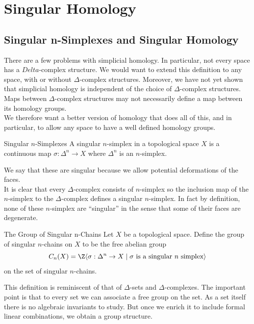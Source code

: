 \documentclass[a4paper]{article}
\begin{document}
\pagebreak
\section{Singular Homology}
\subsection{Singular n-Simplexes and Singular Homology}
There are a few problems with simplicial homology. In particular, not every space has a $Delta$-complex structure. We would want to extend this definition to any space, with or without $\Delta$-complex structures. Moreover, we have not yet shown that simplicial homology is independent of the choice of $\Delta$-complex structures. Maps between $\Delta$-complex structures may not necessarily define a map between its homology groups. \\

We therefore want a better version of homology that does all of this, and in particular, to allow any space to have a well defined homology groups. 

\begin{defn}{Singular $n$-Simplexes}{} A singular $n$-simplex in a topological space $X$ is a continuous map $\sigma:\Delta^n\to X$ where $\Delta^n$ is an $n$-simplex. 
\end{defn}

We say that these are singular because we allow potential deformations of the faces. \\

It is clear that every $\Delta$-complex consists of $n$-simplex so the inclusion map of the $n$-simplex to the $\Delta$-complex defines a singular $n$-simplex. In fact by definition, none of these $n$-simplex are ``singular'' in the sense that some of their faces are degenerate. 

\begin{defn}{The Group of Singular n-Chains}{} Let $X$ be a topological space. Define the group of singular $n$-chains on $X$ to be the free abelian group $$C_n(X)=\Z\langle\sigma:\Delta^n\to X\;|\;\sigma\text{ is a singular }n\text{ simplex}\rangle $$ on the set of singular $n$-chains. 
\end{defn}

This definition is reminiscent of that of $\Delta$-sets and $\Delta$-complexes. The important point is that to every set we can associate a free group on the set. As a set itself there is no algebraic invariants to study. But once we enrich it to include formal linear combinations, we obtain a group structure. 
\end{document}
